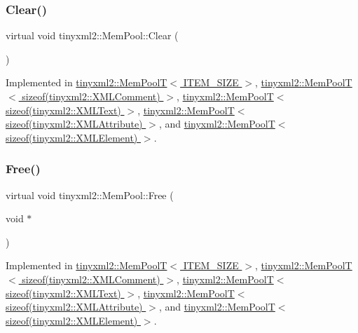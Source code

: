 \mbox{\label{classtinyxml2_1_1_mem_pool_a74fcdef9756917c8ae19fbbb4d658ed7}} 
\subsubsection{\texorpdfstring{Clear()}{Clear()}}
{\footnotesize\ttfamily virtual void tinyxml2\+::\+Mem\+Pool\+::\+Clear (\begin{DoxyParamCaption}{ }\end{DoxyParamCaption})\hspace{0.3cm}{\ttfamily [pure virtual]}}



Implemented in \hyperlink{classtinyxml2_1_1_mem_pool_t_a22d595caa0e9d23aa080f49ca6475fdd}{tinyxml2\+::\+Mem\+Pool\+T$<$ I\+T\+E\+M\+\_\+\+S\+I\+Z\+E $>$}, \hyperlink{classtinyxml2_1_1_mem_pool_t_a22d595caa0e9d23aa080f49ca6475fdd}{tinyxml2\+::\+Mem\+Pool\+T$<$ sizeof(tinyxml2\+::\+X\+M\+L\+Comment) $>$}, \hyperlink{classtinyxml2_1_1_mem_pool_t_a22d595caa0e9d23aa080f49ca6475fdd}{tinyxml2\+::\+Mem\+Pool\+T$<$ sizeof(tinyxml2\+::\+X\+M\+L\+Text) $>$}, \hyperlink{classtinyxml2_1_1_mem_pool_t_a22d595caa0e9d23aa080f49ca6475fdd}{tinyxml2\+::\+Mem\+Pool\+T$<$ sizeof(tinyxml2\+::\+X\+M\+L\+Attribute) $>$}, and \hyperlink{classtinyxml2_1_1_mem_pool_t_a22d595caa0e9d23aa080f49ca6475fdd}{tinyxml2\+::\+Mem\+Pool\+T$<$ sizeof(tinyxml2\+::\+X\+M\+L\+Element) $>$}.

\mbox{\label{classtinyxml2_1_1_mem_pool_a49e3bfac2cba2ebd6776b31e571f64f7}} 
\subsubsection{\texorpdfstring{Free()}{Free()}}
{\footnotesize\ttfamily virtual void tinyxml2\+::\+Mem\+Pool\+::\+Free (\begin{DoxyParamCaption}\item[{void $\ast$}]{ }\end{DoxyParamCaption})\hspace{0.3cm}{\ttfamily [pure virtual]}}



Implemented in \hyperlink{classtinyxml2_1_1_mem_pool_t_a408ce0918e9d3d5e5e1cc4896944875f}{tinyxml2\+::\+Mem\+Pool\+T$<$ I\+T\+E\+M\+\_\+\+S\+I\+Z\+E $>$}, \hyperlink{classtinyxml2_1_1_mem_pool_t_a408ce0918e9d3d5e5e1cc4896944875f}{tinyxml2\+::\+Mem\+Pool\+T$<$ sizeof(tinyxml2\+::\+X\+M\+L\+Comment) $>$}, \hyperlink{classtinyxml2_1_1_mem_pool_t_a408ce0918e9d3d5e5e1cc4896944875f}{tinyxml2\+::\+Mem\+Pool\+T$<$ sizeof(tinyxml2\+::\+X\+M\+L\+Text) $>$}, \hyperlink{classtinyxml2_1_1_mem_pool_t_a408ce0918e9d3d5e5e1cc4896944875f}{tinyxml2\+::\+Mem\+Pool\+T$<$ sizeof(tinyxml2\+::\+X\+M\+L\+Attribute) $>$}, and \hyperlink{classtinyxml2_1_1_mem_pool_t_a408ce0918e9d3d5e5e1cc4896944875f}{tinyxml2\+::\+Mem\+Pool\+T$<$ sizeof(tinyxml2\+::\+X\+M\+L\+Element) $>$}.

